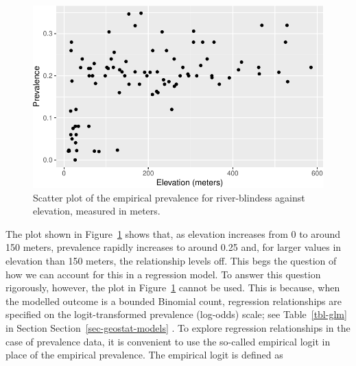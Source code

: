 \documentclass[
  letterpaper,
]{krantz}
\newenvironment{Shaded}{\begin{snugshade}}{\end{snugshade}}
\newcommand{\AttributeTok}[1]{\textcolor[rgb]{0.40,0.45,0.13}{#1}}
\newcommand{\FunctionTok}[1]{\textcolor[rgb]{0.28,0.35,0.67}{#1}}
\newcommand{\NormalTok}[1]{\textcolor[rgb]{0.00,0.23,0.31}{#1}}
\newcommand{\OtherTok}[1]{\textcolor[rgb]{0.00,0.23,0.31}{#1}}
\newcommand{\SpecialCharTok}[1]{\textcolor[rgb]{0.37,0.37,0.37}{#1}}
\newcommand{\StringTok}[1]{\textcolor[rgb]{0.13,0.47,0.30}{#1}}
\begin{document}
\begin{Shaded}
\end{Shaded}

\begin{figure}[H]

{\centering \includegraphics{03_model-fitting_files/figure-pdf/fig-prev-elev-liberia-1.pdf}

}

\caption{\label{fig-prev-elev-liberia}Scatter plot of the empirical
prevalence for river-blindess against elevation, measured in meters.}

\end{figure}

The plot shown in Figure~\ref{fig-prev-elev-liberia} shows that, as
elevation increases from 0 to around 150 meters, prevalence rapidly
increases to around 0.25 and, for larger values in elevation than 150
meters, the relationship levels off. This begs the question of how we
can account for this in a regression model. To answer this question
rigorously, however, the plot in Figure~\ref{fig-prev-elev-liberia}
cannot be used. This is because, when the modelled outcome is a bounded
Binomial count, regression relationships are specified on the
logit-transformed prevalence (log-odds) scale; see Table~\ref{tbl-glm}
in Section Section~\ref{sec-geostat-models} . To explore regression
relationships in the case of prevalence data, it is convenient to use
the so-called empirical logit in place of the empirical prevalence. The
empirical logit is defined as
\end{document}
